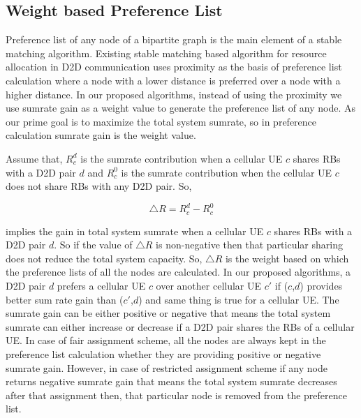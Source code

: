 \documentclass[times]{dacauth}
\begin{document}


\subsection{Weight based Preference List} \label{preference list}


\noindent
Preference list of any node of a bipartite graph is the main element of a stable matching algorithm. Existing stable matching based algorithm \cite{dara} for resource allocation in D2D communication uses proximity as the basis of preference list calculation where a node with a lower distance is preferred over a node with a higher distance. In our proposed algorithms, instead of using the proximity we use sumrate gain as a  weight value to generate the preference list of any node. As our prime goal is to maximize the total system sumrate, so in preference calculation sumrate gain is the weight value. 

\smallskip

\noindent
Assume that, $R_{c}^{d}$ is the sumrate contribution when a cellular UE $c$ shares RBs with a D2D pair $d$ and $R_{c}^{0}$ is the sumrate contribution when the cellular UE $c$ does not share RBs with any D2D pair. So,

\begin{equation}
	\triangle R = R_{c}^{d}-R_{c}^{0} \label{eqn:sum rate increment}
\end{equation}  


\noindent
implies the gain in total system sumrate when a cellular UE $c$ shares RBs with a D2D pair $d$. So if the value of $\triangle R$ is non-negative then that particular sharing does not reduce the total system capacity. So, $\triangle R$ is the weight based on which the preference lists of all the nodes are calculated. In our proposed algorithms, a D2D pair $d$ prefers a cellular UE $c$ over another cellular UE $c'$ if ($c$,$d$) provides better sum rate gain than ($c'$,$d$) and same thing is true for a cellular UE. The sumrate gain can be either positive or negative that means the total system sumrate can either increase or decrease if a D2D pair shares the RBs of a cellular UE. In case of fair assignment scheme, all the nodes are always kept in the preference list calculation whether they are providing positive or negative sumrate gain. However, in case of restricted assignment scheme if any node returns negative sumrate gain that means the total system sumrate decreases after that assignment then, that particular node is removed from the preference list.
 
\end{document}
